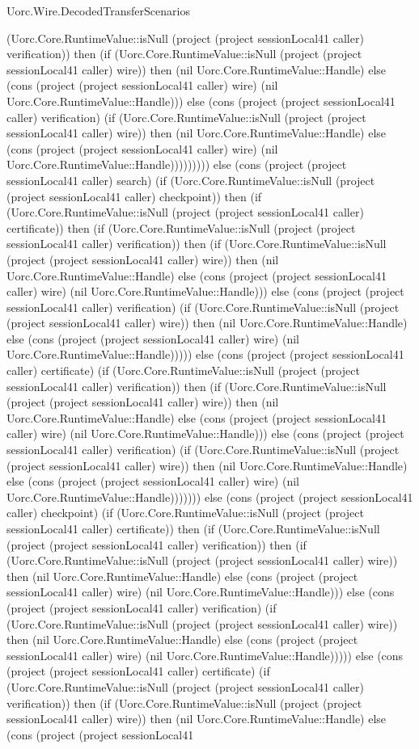 \begin{lexlean}{Uorc.Wire.DecodedTransferScenarios}
\begin{semanticmodule}
{(Uorc.Core.RuntimeValue::isNull (project (project sessionLocal41 caller) verification)) then (if (Uorc.Core.RuntimeValue::isNull (project (project sessionLocal41 caller) wire)) then (nil Uorc.Core.RuntimeValue::Handle) else (cons (project (project sessionLocal41 caller) wire) (nil Uorc.Core.RuntimeValue::Handle))) else (cons (project (project sessionLocal41 caller) verification) (if (Uorc.Core.RuntimeValue::isNull (project (project sessionLocal41 caller) wire)) then (nil Uorc.Core.RuntimeValue::Handle) else (cons (project (project sessionLocal41 caller) wire) (nil Uorc.Core.RuntimeValue::Handle))))))))) else (cons (project (project sessionLocal41 caller) search) (if (Uorc.Core.RuntimeValue::isNull (project (project sessionLocal41 caller) checkpoint)) then (if (Uorc.Core.RuntimeValue::isNull (project (project sessionLocal41 caller) certificate)) then (if (Uorc.Core.RuntimeValue::isNull (project (project sessionLocal41 caller) verification)) then (if (Uorc.Core.RuntimeValue::isNull (project (project sessionLocal41 caller) wire)) then (nil Uorc.Core.RuntimeValue::Handle) else (cons (project (project sessionLocal41 caller) wire) (nil Uorc.Core.RuntimeValue::Handle))) else (cons (project (project sessionLocal41 caller) verification) (if (Uorc.Core.RuntimeValue::isNull (project (project sessionLocal41 caller) wire)) then (nil Uorc.Core.RuntimeValue::Handle) else (cons (project (project sessionLocal41 caller) wire) (nil Uorc.Core.RuntimeValue::Handle))))) else (cons (project (project sessionLocal41 caller) certificate) (if (Uorc.Core.RuntimeValue::isNull (project (project sessionLocal41 caller) verification)) then (if (Uorc.Core.RuntimeValue::isNull (project (project sessionLocal41 caller) wire)) then (nil Uorc.Core.RuntimeValue::Handle) else (cons (project (project sessionLocal41 caller) wire) (nil Uorc.Core.RuntimeValue::Handle))) else (cons (project (project sessionLocal41 caller) verification) (if (Uorc.Core.RuntimeValue::isNull (project (project sessionLocal41 caller) wire)) then (nil Uorc.Core.RuntimeValue::Handle) else (cons (project (project sessionLocal41 caller) wire) (nil Uorc.Core.RuntimeValue::Handle))))))) else (cons (project (project sessionLocal41 caller) checkpoint) (if (Uorc.Core.RuntimeValue::isNull (project (project sessionLocal41 caller) certificate)) then (if (Uorc.Core.RuntimeValue::isNull (project (project sessionLocal41 caller) verification)) then (if (Uorc.Core.RuntimeValue::isNull (project (project sessionLocal41 caller) wire)) then (nil Uorc.Core.RuntimeValue::Handle) else (cons (project (project sessionLocal41 caller) wire) (nil Uorc.Core.RuntimeValue::Handle))) else (cons (project (project sessionLocal41 caller) verification) (if (Uorc.Core.RuntimeValue::isNull (project (project sessionLocal41 caller) wire)) then (nil Uorc.Core.RuntimeValue::Handle) else (cons (project (project sessionLocal41 caller) wire) (nil Uorc.Core.RuntimeValue::Handle))))) else (cons (project (project sessionLocal41 caller) certificate) (if (Uorc.Core.RuntimeValue::isNull (project (project sessionLocal41 caller) verification)) then (if (Uorc.Core.RuntimeValue::isNull (project (project sessionLocal41 caller) wire)) then (nil Uorc.Core.RuntimeValue::Handle) else (cons (project (project sessionLocal41 }
\end{semanticmodule}
\end{lexlean}
